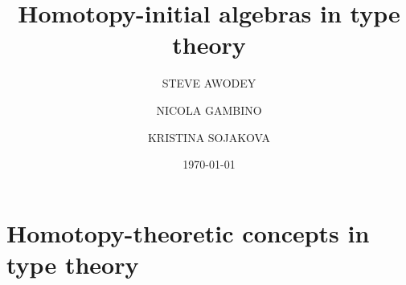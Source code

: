 \documentclass[10pt,a4paper,oneside,reqno]{amsart}
\numberwithin{equation}{section}
\theoremstyle{mythm}
\theoremstyle{mydef}
\theoremstyle{myrmk}
\begin{document}
\title[]{Homotopy-initial algebras in type theory}
\author[S. Awodey]{STEVE AWODEY}
\address{Steve Awodey, Department of Philosophy 
Carnegie Mellon University 
Pittsburgh, PA  15213, USA}
\author[N. Gambino]{NICOLA GAMBINO}
\address{Nicola Gambino, School of Mathematics, University of Leeds, Leeds LS2 9JT, UK}
\author[K. Sojakova]{KRISTINA SOJAKOVA}
\address{Kristina Sojakova, Department of Computer Science, Carnegie Mellon University, Pittsburgh, PA 15213, USA}
\date{\today}





\maketitle



\begin{small}
\tableofcontents
\end{small}



\section{Homotopy-theoretic concepts in type theory}
\label{sec:bac}
\end{document}
